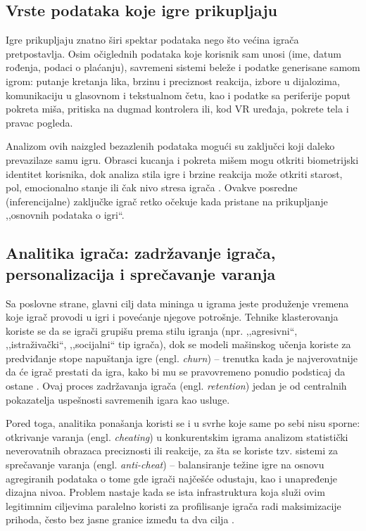 \documentclass[12pt]{article}
\begin{document}
\subsection{Vrste podataka koje igre prikupljaju}

Igre prikupljaju znatno širi spektar podataka nego što većina igrača pretpostavlja. Osim očiglednih podataka koje korisnik sam unosi (ime, datum rođenja, podaci o plaćanju), savremeni sistemi beleže i podatke generisane samom igrom: putanje kretanja lika, brzinu i preciznost reakcija, izbore u dijalozima, komunikaciju u glasovnom i tekstualnom četu, kao i podatke sa periferije poput pokreta miša, pritiska na dugmad kontrolera ili, kod VR uređaja, pokrete tela i pravac pogleda. 

Analizom ovih naizgled bezazlenih podataka mogući su zaključci koji daleko prevazilaze samu igru. Obrasci kucanja i pokreta mišem mogu otkriti biometrijski identitet korisnika, dok analiza stila igre i brzine reakcija može otkriti starost, pol, emocionalno stanje ili čak nivo stresa igrača \cite{kroger2023}. Ovakve posredne (inferencijalne) zaključke igrač retko očekuje kada pristane na prikupljanje ,,osnovnih podataka o igri``.

\subsection{Analitika igrača: zadržavanje igrača, personalizacija i sprečavanje varanja}

Sa poslovne strane, glavni cilj data mininga u igrama jeste produženje vremena koje igrač provodi u igri i povećanje njegove potrošnje. Tehnike klasterovanja koriste se da se igrači grupišu prema stilu igranja (npr. ,,agresivni``, ,,istraživački``, ,,socijalni`` tip igrača), dok se modeli mašinskog učenja koriste za predviđanje stope napuštanja igre (engl. \textit{churn}) -- trenutka kada je najverovatnije da će igrač prestati da igra, kako bi mu se pravovremeno ponudio podsticaj da ostane \cite{drachen2013}. Ovaj proces zadržavanja igrača (engl. \textit{retention}) jedan je od centralnih pokazatelja uspešnosti savremenih igara kao usluge.

Pored toga, analitika ponašanja koristi se i u svrhe koje same po sebi nisu sporne: otkrivanje varanja (engl. \textit{cheating}) u konkurentskim igrama analizom statistički neverovatnih obrazaca preciznosti ili reakcije, za šta se koriste tzv. sistemi za sprečavanje varanja (engl. \textit{anti-cheat}) -- balansiranje težine igre na osnovu agregiranih podataka o tome gde igrači najčešće odustaju, kao i unapređenje dizajna nivoa. Problem nastaje kada se ista infrastruktura koja služi ovim legitimnim ciljevima paralelno koristi za profilisanje igrača radi maksimizacije prihoda, često bez jasne granice između ta dva cilja \cite{bourdoucen2023}.
\end{document}
